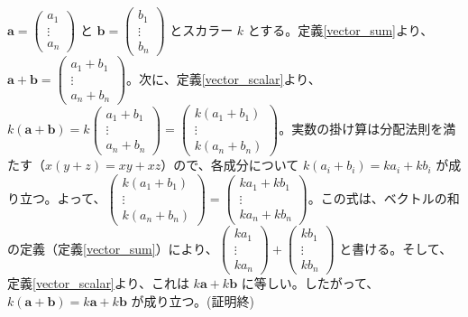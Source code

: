 \begin{thm}[スカラー倍の性質]
\begin{proof*}
$\bm{a} = \begin{pmatrix} a_1 \\ \vdots \\ a_n \end{pmatrix}$ と $\bm{b} = \begin{pmatrix} b_1 \\ \vdots \\ b_n \end{pmatrix}$ とスカラー $k$ とする。定義\ref{vector_sum}より、$\bm{a} + \bm{b} = \begin{pmatrix} a_1 + b_1 \\ \vdots \\ a_n + b_n \end{pmatrix}$。次に、定義\ref{vector_scalar}より、$k(\bm{a} + \bm{b}) = k \begin{pmatrix} a_1 + b_1 \\ \vdots \\ a_n + b_n \end{pmatrix} = \begin{pmatrix} k(a_1 + b_1) \\ \vdots \\ k(a_n + b_n) \end{pmatrix}$。実数の掛け算は分配法則を満たす（$x(y+z) = xy+xz$）ので、各成分について $k(a_i + b_i) = k a_i + k b_i$ が成り立つ。よって、$\begin{pmatrix} k(a_1 + b_1) \\ \vdots \\ k(a_n + b_n) \end{pmatrix} = \begin{pmatrix} k a_1 + k b_1 \\ \vdots \\ k a_n + k b_n \end{pmatrix}$。この式は、ベクトルの和の定義（定義\ref{vector_sum}）により、$\begin{pmatrix} k a_1 \\ \vdots \\ k a_n \end{pmatrix} + \begin{pmatrix} k b_1 \\ \vdots \\ k b_n \end{pmatrix}$ と書ける。そして、定義\ref{vector_scalar}より、これは $k\bm{a} + k\bm{b}$ に等しい。したがって、$k(\bm{a}+\bm{b}) = k\bm{a} + k\bm{b}$ が成り立つ。(証明終)
\end{proof*}
\end{thm}

